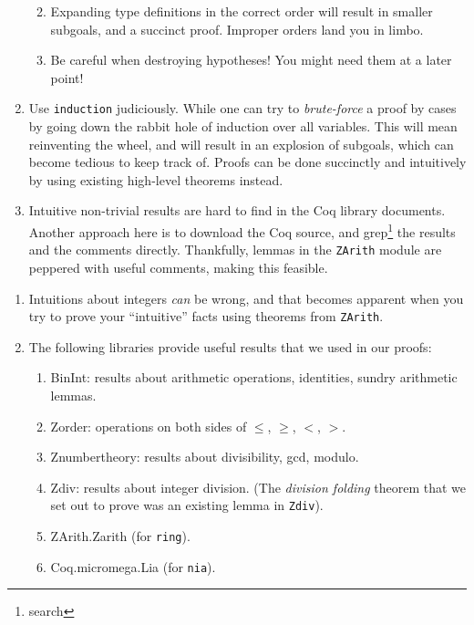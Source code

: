 \begin{enumerate}
  \begin{enumerate}
  \def\labelenumii{\roman{enumii}.}
  \tightlist
  \item
    Expanding type definitions in the correct order will result in
    smaller subgoals, and a succinct proof. Improper orders land you in
    limbo.
  \item
    Be careful when destroying hypotheses! You might need them at a
    later point!
  \end{enumerate}
\item
  Use \texttt{induction} judiciously. While one can try to
  \emph{brute-force} a proof by cases by going down the rabbit hole of
  induction over all variables. This will mean reinventing the wheel,
  and will result in an explosion of subgoals, which can become tedious
  to keep track of. Proofs can be done succinctly and intuitively by
  using existing high-level theorems instead.
\item
  Intuitive non-trivial results are hard to find in the Coq library
  documents. Another approach here is to download the Coq source, and
  grep\footnote{search} the results and the comments directly.
  Thankfully, lemmas in the \texttt{ZArith} module are peppered with
  useful comments, making this feasible.
\end{enumerate}

\begin{enumerate}
\def\labelenumi{\arabic{enumi}.}
\setcounter{enumi}{6}
\item
  Intuitions about integers \emph{can} be wrong, and that becomes
  apparent when you try to prove your ``intuitive'' facts using theorems
  from \texttt{ZArith}.
\item
  The following libraries provide useful results that we used in our
  proofs:

  \begin{enumerate}
  \def\labelenumii{\roman{enumii}.}
  \tightlist
  \item
    BinInt: results about arithmetic operations, identities, sundry
    arithmetic lemmas.
  \item
    Zorder: operations on both sides of \(\le\), \(\ge\), \(<\), \(>\).
  \item
    Znumbertheory: results about divisibility, gcd, modulo.
  \item
    Zdiv: results about integer division. (The \emph{division folding}
    theorem that we set out to prove was an existing lemma in
    \texttt{Zdiv}).
  \item
    ZArith.Zarith (for \texttt{ring}).
  \item
    Coq.micromega.Lia (for \texttt{nia}).
  \end{enumerate}
\end{enumerate}

